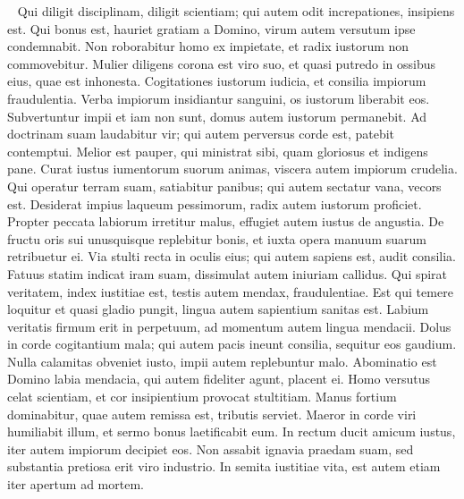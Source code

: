\begin{biblechapter}   
\verse Qui diligit disciplinam, diligit scientiam; qui autem odit increpationes, insipiens est. 
\verse Qui bonus est, hauriet gratiam a Domino, virum autem versutum ipse condemnabit. 
\verse Non roborabitur homo ex impietate, et radix iustorum non commovebitur. 
\verse Mulier diligens corona est viro suo, et quasi putredo in ossibus eius, quae est inhonesta. 
\verse Cogitationes iustorum iudicia, et consilia impiorum fraudulentia. 
\verse Verba impiorum insidiantur sanguini, os iustorum liberabit eos. 
\verse Subvertuntur impii et iam non sunt, domus autem iustorum permanebit. 
\verse Ad doctrinam suam laudabitur vir; qui autem perversus corde est, patebit contemptui. 
\verse Melior est pauper, qui ministrat sibi, quam gloriosus et indigens pane. 
\verse Curat iustus iumentorum suorum animas, viscera autem impiorum crudelia. 
\verse Qui operatur terram suam, satiabitur panibus; qui autem sectatur vana, vecors est. 
\verse Desiderat impius laqueum pessimorum, radix autem iustorum proficiet. 
\verse Propter peccata labiorum irretitur malus, effugiet autem iustus de angustia. 
\verse De fructu oris sui unusquisque replebitur bonis, et iuxta opera manuum suarum retribuetur ei. 
\verse Via stulti recta in oculis eius; qui autem sapiens est, audit consilia. 
\verse Fatuus statim indicat iram suam, dissimulat autem iniuriam callidus. 
\verse Qui spirat veritatem, index iustitiae est, testis autem mendax, fraudulentiae. 
\verse Est qui temere loquitur et quasi gladio pungit, lingua autem sapientium sanitas est. 
\verse Labium veritatis firmum erit in perpetuum, ad momentum autem lingua mendacii. 
\verse Dolus in corde cogitantium mala; qui autem pacis ineunt consilia, sequitur eos gaudium. 
\verse Nulla calamitas obveniet iusto, impii autem replebuntur malo. 
\verse Abominatio est Domino labia mendacia, qui autem fideliter agunt, placent ei. 
\verse Homo versutus celat scientiam, et cor insipientium provocat stultitiam. 
\verse Manus fortium dominabitur, quae autem remissa est, tributis serviet. 
\verse Maeror in corde viri humiliabit illum, et sermo bonus laetificabit eum. 
\verse In rectum ducit amicum iustus, iter autem impiorum decipiet eos. 
\verse Non assabit ignavia praedam suam, sed substantia pretiosa erit viro industrio. 
\verse In semita iustitiae vita, est autem etiam iter apertum ad mortem. 
\end{biblechapter}

